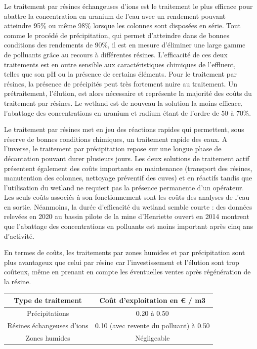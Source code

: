 \documentclass{article}
\begin{document}
Le traitement par résines échangeuses d’ions est le traitement le plus efficace pour abattre la concentration en uranium de l’eau avec un rendement pouvant atteindre 95\% ou même 98\% lorsque les colonnes sont disposées en série.  Tout comme le procédé de précipitation, qui permet d’atteindre dans de bonnes conditions des rendements de 90\%, il est en mesure d’éliminer une large gamme de polluants grâce au recours à différentes résines. L’efficacité de ces deux traitements est en outre sensible aux caractéristiques chimiques de l’effluent, telles que son pH ou la présence de certains éléments. Pour le traitement par résines, la présence de précipités peut très fortement nuire au traitement. Un prétraitement, l’élution, est alors nécessaire et représente la majorité des coûts du traitement par résines. Le wetland est de nouveau la solution la moins efficace, l’abattage des concentrations en uranium et radium étant de l’ordre de 50 à 70\%.

Le traitement par résines met en jeu des réactions rapides qui permettent, sous réserve de bonnes conditions chimiques, un traitement rapide des eaux. A l’inverse, le traitement par précipitation repose sur une longue phase de décantation pouvant durer plusieurs jours. Les deux solutions de traitement actif présentent également des coûts importants en maintenance (transport des résines, manutention des colonnes, nettoyage préventif des cuves) et en réactifs tandis que l’utilisation du wetland ne requiert pas la présence permanente d’un opérateur. Les seuls coûts associés à son fonctionnement sont les coûts des analyses de l’eau en sortie.  Néanmoins, la durée d’efficacité du wetland semble courte : des données relevées en 2020 au bassin pilote de la mine d’Henriette ouvert en 2014 montrent que l’abattage des concentrations en polluants est moins important après cinq ans d’activité. 

En termes de coûts, les traitements par zones humides et par précipitation sont plus avantageux que celui par résine car l’investissement et l’élution sont trop coûteux, même en prenant en compte les éventuelles ventes après régénération de la résine.


\begin{center}
\begin{tabular}{ |c |c |}
\hline
 Type de traitement & Coût d’exploitation en € / m3 \\ 
 \hline
 Précipitations & 0.20 à 0.50 \\ 
 \hline
 Résines échangeuses d’ions & 0.10 (avec revente du polluant) à 0.50  \\
 \hline
Zones humides & Négligeable  \\
 \hline
\end{tabular}
\end{center}
\end{document}
